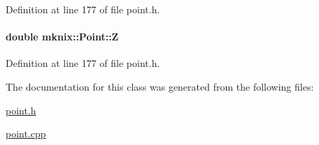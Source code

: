 Definition at line 177 of file point.\+h.

\hypertarget{classmknix_1_1_point_a1742974a0d33897c3b04bc420ef87d31}{}
\paragraph[{Z}]{\setlength{\rightskip}{0pt plus 5cm}double mknix\+::\+Point\+::\+Z\hspace{0.3cm}{\ttfamily [protected]}}\label{classmknix_1_1_point_a1742974a0d33897c3b04bc420ef87d31}


Definition at line 177 of file point.\+h.



The documentation for this class was generated from the following files\+:\begin{DoxyCompactItemize}
\item 
\hyperlink{point_8h}{point.\+h}\item 
\hyperlink{point_8cpp}{point.\+cpp}\end{DoxyCompactItemize}
